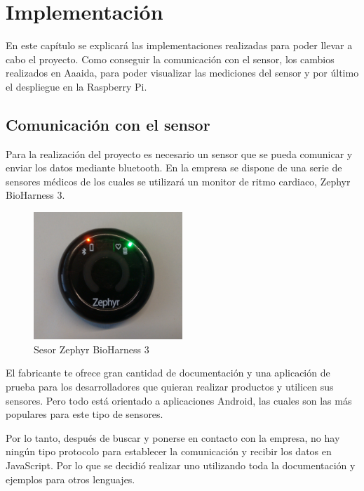 \chapter{Implementación}

En este capítulo se explicará las implementaciones realizadas para poder llevar a cabo el proyecto. Como conseguir la comunicación con el sensor, los cambios realizados en Aaaida, para poder visualizar las mediciones del sensor y por último el despliegue en la Raspberry Pi. 

\section{Comunicación con el sensor}

Para la realización del proyecto es necesario un sensor que se pueda comunicar y enviar los datos mediante bluetooth. En la empresa se dispone de una serie de sensores médicos de los cuales se utilizará un monitor de ritmo cardiaco, Zephyr BioHarness 3. 

\begin{figure}[htb]
\begin{center}
\includegraphics[width=0.5\textwidth]{./setup/zephyr}
\caption{Sesor Zephyr BioHarness 3}
\end{center}
\end{figure}

El fabricante te ofrece gran cantidad de documentación y una aplicación de prueba para los desarrolladores que quieran realizar productos y utilicen sus sensores. Pero todo está orientado a aplicaciones Android, las cuales son las más populares para este tipo de sensores. 

Por lo tanto, después de buscar y ponerse en contacto con la empresa, no hay ningún tipo protocolo para establecer la comunicación y recibir los datos en JavaScript. Por lo que se decidió realizar uno utilizando toda la documentación y ejemplos para otros lenguajes. 

